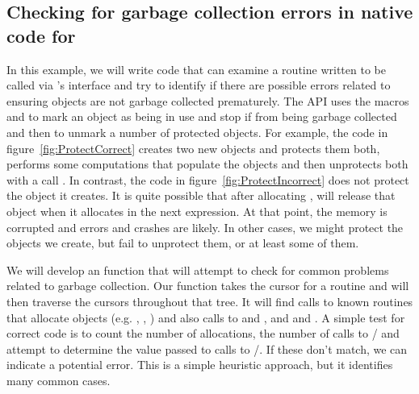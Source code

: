 \subsection[Checking for garbage collection errors in native code for R]{Checking for garbage collection errors in native code for \R{}}\label{sec:ProtectEG}
In this example, we will write code that can examine a \C{} routine
written to be called via \R's  interface and try to
identify if there are possible errors related to ensuring \R{} objects
are not garbage collected prematurely.  The \R{} API uses the macros
 and  to mark an object as being in
use and stop if from being garbage collected and then to unmark a number of
protected objects.  For example, the \C{} code in
figure~\ref{fig:ProtectCorrect} creates two new \R{} objects and
protects them both, performs some computations that populate the
objects and then unprotects both with a call .  In
contrast, the code in figure~\ref{fig:ProtectIncorrect} does not
protect the \R{} object it creates.  It is quite possible that after
allocating , \R{} will release that object when it allocates
 in the next expression. At that point, the memory is
corrupted and errors and crashes are likely.
In other cases, we might protect the \R{} objects we create,
but fail to unprotect them, or at least some of them.



We will develop an \R{} function that will attempt to check for common
problems related to garbage collection.  Our function takes the
\libclang{} cursor for a routine and will then traverse the cursors
throughout that tree. It will find calls to known routines that
allocate \R{} objects (e.g. ,
, ) and also calls to
 and , and  and
.  A simple test for correct code is to count the
number of allocations, the number of calls to
/ and attempt to determine the value
passed to calls to /.  If these
don't match, we can indicate a potential error.  This is a simple
heuristic approach, but it identifies many common cases.

\begin{comment}
What about \Cfunc{NEW_NUMERIC}, \Cfunc{PROTECT} and \Cfunc{UNPROTECT}?
In some cases, these are acutally pre-processor macros and in others
they are routines. They expand to
\Cexpr{Rf_allocVector(REALSXP, n)} and calls to \Cfunc{Rf_protect} and
\Cfunc{Rf_unprotect}.  We can find these expansions and substitutions
in the translation unit. Alternatively, we can use our knowledge of
how the \R{} API works.
\end{comment}

